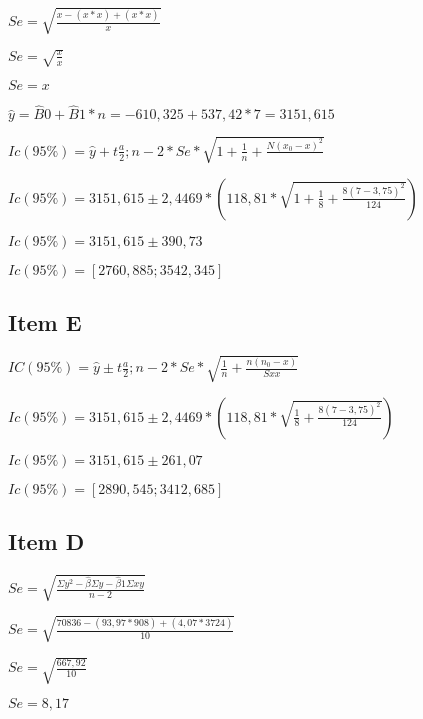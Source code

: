 \documentclass{article}
\begin{document}
\begin{flushleft}
$Se = \sqrt{ \frac{x - (x * x)+ (x * x) }{x}}$

$Se = \sqrt{ \frac{x }{x}}$

$Se = x$
\end{flushleft}   

\begin{flushleft}
$\hat{y} = \hat{B}0 + \hat{B}1 *n = -610,325 + 537,42 * 7=3151,615$
\end{flushleft}   

\begin{flushleft}
$Ic(95\%) = \hat{y} + t\frac{a}{2};n-2 *Se* \sqrt{1 + \frac{1}{n} +\frac{N(x_0 -x)^2}{}}$

$Ic(95\%) = 3151,615 \pm 2,4469 *  (118,81* \sqrt{1 + \frac{1}{8} + \frac{8(7-3,75)^2}{124}})$

$Ic(95\%) =  3151,615 \pm 390,73$

$Ic(95\%) = [2760,885 ; 3542,345]$
\end{flushleft}


\subsection{Item E}

\begin{flushleft}
$IC(95\%) = \hat{y} \pm  t \frac{a}{2}; n-2 *Se * \sqrt{\frac{1}{n} + \frac{n(n_0 - x)}{Sxx}}$ 

$Ic(95\%) = 3151,615 \pm 2,4469 *  (118,81* \sqrt{\frac{1}{8} + \frac{8(7-3,75)^2}{124}})$

$Ic(95\%) =  3151,615 \pm 261,07$

$Ic(95\%) = [2890,545 ; 3412,685]$

\end{flushleft}








        \subsection{Item D}
            \begin{flushleft}
                $Se = \sqrt{ \frac{\Sigma y^2 - \hat{\beta } \Sigma y - \hat{\beta}1 \Sigma xy }{n-2}}$
            \end{flushleft}    
            
            \begin{flushleft}
                $Se = \sqrt{ \frac{70836 - (93,97*908)+ (4,07*3724) }{10}}$

                $Se = \sqrt{ \frac{667,92 }{10}}$

                $Se = 8,17$
            \end{flushleft}      
\end{document}
